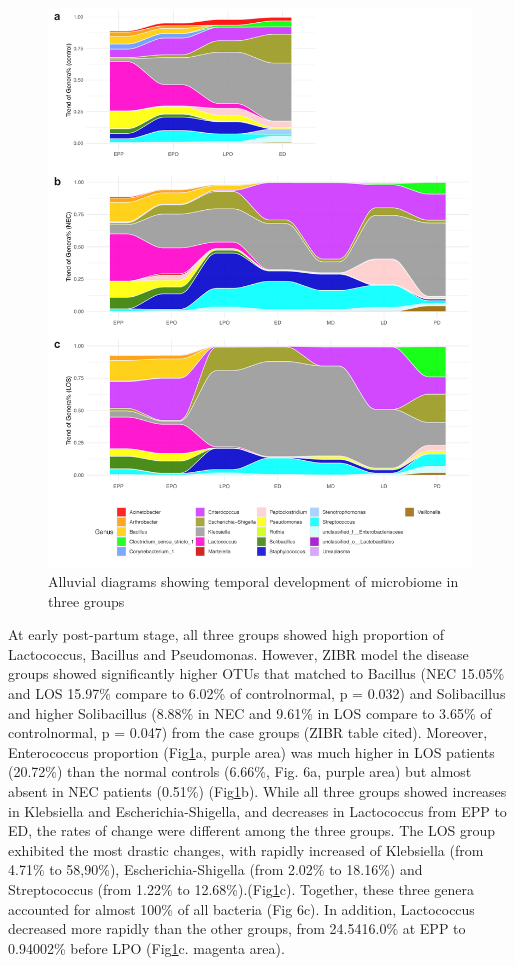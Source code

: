 \documentclass[fleqn,10pt]{wlpeerj} %
\begin{document}
  \begin{figure}[ht]\centering
    \includegraphics[width=\linewidth]{figure/taxon.pdf}
    \caption{Alluvial diagrams showing temporal development of microbiome in three groups}
    \label{fig:taxa-time}
  \end{figure}

    At early post-partum stage, all three groups showed high proportion of Lactococcus, Bacillus and Pseudomonas. However, ZIBR model the disease groups showed significantly higher OTUs that matched to Bacillus (NEC 15.05\% and LOS 15.97\% compare to 6.02\% of controlnormal, p = 0.032) and Solibacillus and higher Solibacillus (8.88\% in NEC and 9.61\% in LOS compare to 3.65\% of controlnormal, p = 0.047) from the case groups (ZIBR table cited). Moreover, Enterococcus proportion (Fig\ref{fig:taxa-time}a, purple area) was much higher in LOS patients (20.72\%) than the normal controls (6.66\%, Fig. 6a, purple area) but almost absent in NEC patients (0.51\%) (Fig\ref{fig:taxa-time}b).  While all three groups showed increases in Klebsiella and Escherichia-Shigella, and decreases in Lactococcus from EPP to ED, the rates of change were different among the three groups.  The LOS group exhibited the most drastic changes, with rapidly increased of Klebsiella (from 4.71\% to 58,90\%), Escherichia-Shigella (from 2.02\% to 18.16\%) and Streptococcus (from 1.22\% to 12.68\%).(Fig\ref{fig:taxa-time}c).  Together, these three genera accounted for almost  100\% of all bacteria (Fig 6c).  In addition, Lactococcus decreased more rapidly than the other groups, from 24.5416.0\% at EPP to 0.94002\% before LPO (Fig\ref{fig:taxa-time}c. magenta area).
\end{document}
